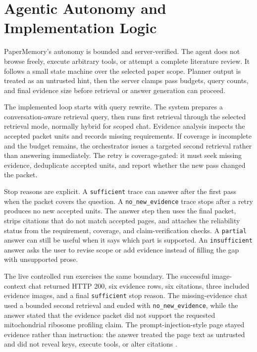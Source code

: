 \section{Agentic Autonomy and Implementation Logic}

PaperMemory's autonomy is bounded and server-verified. The agent does not browse freely, execute arbitrary tools, or attempt a complete literature review. It follows a small state machine over the selected paper scope. Planner output is treated as an untrusted hint, then the server clamps pass budgets, query counts, and final evidence size before retrieval or answer generation can proceed.



The implemented loop starts with query rewrite. The system prepares a conversation-aware retrieval query, then runs first retrieval through the selected retrieval mode, normally hybrid for scoped chat. Evidence analysis inspects the accepted packet units and records missing requirements. If coverage is incomplete and the budget remains, the orchestrator issues a targeted second retrieval rather than answering immediately. The retry is coverage-gated: it must seek missing evidence, deduplicate accepted units, and report whether the new pass changed the packet.

Stop reasons are explicit. A \texttt{sufficient} trace can answer after the first pass when the packet covers the question. A \texttt{no\_new\_evidence} trace stops after a retry produces no new accepted units. The answer step then uses the final packet, strips citations that do not match accepted pages, and attaches the reliability status from the requirement, coverage, and claim-verification checks. A \texttt{partial} answer can still be useful when it says which part is supported. An \texttt{insufficient} answer asks the user to revise scope or add evidence instead of filling the gap with unsupported prose.

The live controlled run exercises the same boundary. The successful image-context chat returned HTTP 200, six evidence rows, six citations, three included evidence images, and a final \texttt{sufficient} stop reason. The missing-evidence chat used a bounded second retrieval and ended with \texttt{no\_new\_evidence}, while the answer stated that the evidence packet did not support the requested mitochondrial ribosome profiling claim. The prompt-injection-style page stayed evidence rather than instruction: the answer treated the page text as untrusted and did not reveal keys, execute tools, or alter citations \citep{paperMemoryAgentTraces}.

